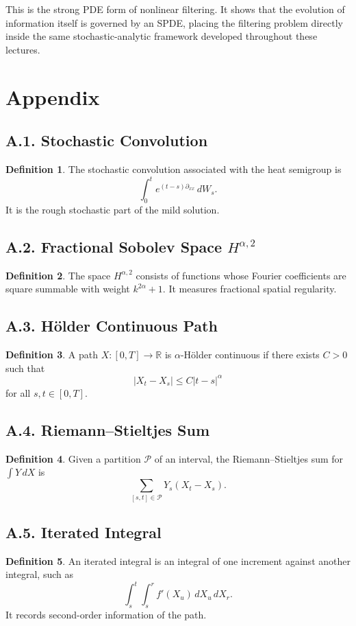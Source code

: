 \documentclass[11pt]{article}
\theoremstyle{definition}
\newtheorem{definition}{Definition}
\theoremstyle{remark}
\begin{document}
This is the strong PDE form of nonlinear filtering. It shows that the evolution of information itself is governed by an SPDE, placing the filtering problem directly inside the same stochastic-analytic framework developed throughout these lectures.

\section*{Appendix}

\subsection*{A.1. Stochastic Convolution}
\begin{definition}
The stochastic convolution associated with the heat semigroup is
\[
\int_0^t e^{(t-s)\partial_{xx}}\,dW_s.
\]
It is the rough stochastic part of the mild solution.
\end{definition}

\subsection*{A.2. Fractional Sobolev Space \(H^{\alpha,2}\)}
\begin{definition}
The space \(H^{\alpha,2}\) consists of functions whose Fourier coefficients are square summable with weight \(k^{2\alpha}+1\). It measures fractional spatial regularity.
\end{definition}

\subsection*{A.3. Hölder Continuous Path}
\begin{definition}
A path \(X:[0,T]\to\mathbb R\) is \(\alpha\)-Hölder continuous if there exists \(C>0\) such that
\[
|X_t-X_s|\le C|t-s|^\alpha
\]
for all \(s,t\in[0,T]\).
\end{definition}

\subsection*{A.4. Riemann--Stieltjes Sum}
\begin{definition}
Given a partition \(\mathcal P\) of an interval, the Riemann--Stieltjes sum for \(\int Y\,dX\) is
\[
\sum_{[s,t]\in\mathcal P} Y_s(X_t-X_s).
\]
\end{definition}

\subsection*{A.5. Iterated Integral}
\begin{definition}
An iterated integral is an integral of one increment against another integral, such as
\[
\int_s^t\int_s^r f'(X_u)\,dX_u\,dX_r.
\]
It records second-order information of the path.
\end{definition}
\end{document}
